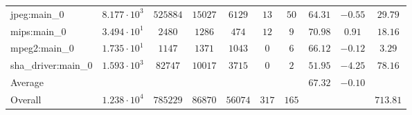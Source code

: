 \begin{tabular}{|l|c|c|c|c|c|c|c|c|c|}
jpeg:main\_0            & $ 8.177 \cdot 10^{3} $ & $ 525884 $ & $ 15027 $ & $ 6129  $ & $ 13  $ & $ 50  $ & $ 64.31       $ & $ -0.55   $ & $ 29.79   $ \\
mips:main\_0            & $ 3.494 \cdot 10^{1} $ & $ 2480   $ & $ 1286  $ & $ 474   $ & $ 12  $ & $ 9   $ & $ 70.98       $ & $ 0.91    $ & $ 18.16   $ \\
mpeg2:main\_0           & $ 1.735 \cdot 10^{1} $ & $ 1147   $ & $ 1371  $ & $ 1043  $ & $ 0   $ & $ 6   $ & $ 66.12       $ & $ -0.12   $ & $ 3.29    $ \\
sha\_driver:main\_0     & $ 1.593 \cdot 10^{3} $ & $ 82747  $ & $ 10017 $ & $ 3715  $ & $ 0   $ & $ 2   $ & $ 51.95       $ & $ -4.25   $ & $ 78.16   $ \\
\hline
Average                 & $                    $ & $        $ & $       $ & $       $ & $     $ & $     $ & $ 67.32       $ & $ -0.10   $ & $         $ \\
\hline
Overall                 & $ 1.238 \cdot 10^{4} $ & $ 785229 $ & $ 86870 $ & $ 56074 $ & $ 317 $ & $ 165 $ & $             $ & $         $ & $ 713.81  $ \\
\hline
\end{tabular}
